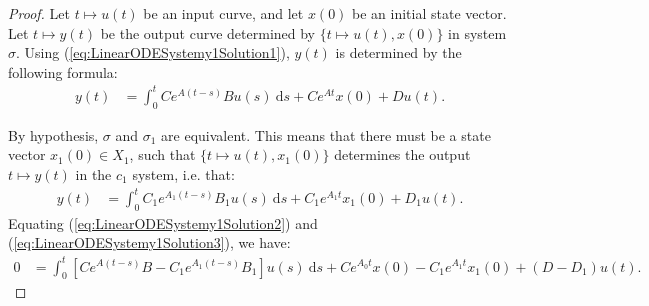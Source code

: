 \documentclass[12pt]{book}
\theoremstyle{plain}
\theoremstyle{definition}
\newcommand{\dd}[1]{\mathrm{d}#1}
\begin{document}
\begin{proof}
    Let $t \mapsto u(t)$ be an input curve, and let $x(0)$ be an initial state vector. Let $t \mapsto y(t)$ be the output curve determined by $\{t \mapsto u(t), x(0)\}$ in system $\sigma$. Using (\ref{eq:LinearODESystemy1Solution1}), $y(t)$ is determined by the following formula:
    \begin{align} \label{eq:LinearODESystemy1Solution2}
        y(t) &= \int_0^t Ce^{A(t-s)}Bu(s)\ \dd{s} + Ce^{At}x(0) + Du(t).
    \end{align}
    
    By hypothesis, $\sigma$ and $\sigma_1$ are equivalent.
    This means that there must be a state vector $x_1(0) \in X_1$, such that $\{t \mapsto u(t), x_1(0)\}$ determines the output $t \mapsto y(t)$ in the $c_1$ system, i.e. that:
    \begin{align} \label{eq:LinearODESystemy1Solution3}
        y(t) &= \int_0^t C_1e^{A_1(t-s)}B_1u(s)\ \dd{s} + C_1e^{A_1t}x_1(0) + D_1u(t).
    \end{align}
    Equating (\ref{eq:LinearODESystemy1Solution2}) and (\ref{eq:LinearODESystemy1Solution3}), we have:
    \begin{align} \label{eq:LinearODESystemy1Solution4}
        0 &= \int_0^t \left[Ce^{A(t-s)}B-C_1e^{A_1(t-s)}B_1\right]u(s)\ \dd{s} + Ce^{A_0t}x(0) - C_1e^{A_1t}x_1(0) + (D-D_1)u(t).
    \end{align}
    

\end{proof}
\end{document}
